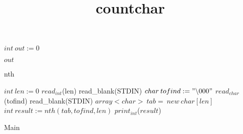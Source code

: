 \documentclass[8pt]{article}
\title{countchar}
\begin{document}
\maketitle
\begin{algorithm}[H]
$int\:out := 0$\;

\Return $ out $\;
\caption{nth}
\end{algorithm}

\begin{algorithm}[H]
$int\:len := 0$\;
$read_{int}$(len)\;
read\_blank(STDIN)\;
$char\:tofind := "\backslash000"$\;
$read_{char}$(tofind)\;
read\_blank(STDIN)\;
$array<char>\:tab=\:new\:char[len]$\;
$int\:result := nth(tab, tofind, len)$\;
$print_{int}$($ result $)\;
\caption{Main}
\end{algorithm}
\end{document}
